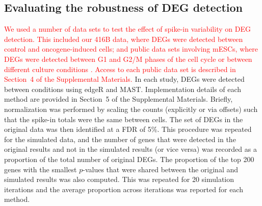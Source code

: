 \documentclass{article}
\newcommand{\suppsecdata}{4}
\newcommand{\suppsecsim}{5}
\newcommand{\revised}[1]{\textcolor{red}{#1}}
\begin{document}

\subsection*{Evaluating the robustness of DEG detection}
\revised{We used a number of data sets to test the effect of spike-in variability on DEG detection.
This included our 416B data, where DEGs were detected between control and oncogene-induced cells;
and public data sets involving mESCs, where DEGs were detected between G1 and G2/M phases of the cell cycle \autocite{buettner2015computational}
or between different culture conditions \autocite{grun2014validation,kolod2015single}.
Access to each public data set is described in Section~\suppsecdata{} of the Supplemental Materials.}
In each study, DEGs were detected between conditions using edgeR and MAST.
Implementation details of each method are provided in Section~\suppsecsim{} of the Supplemental Materials. 
Briefly, normalization was performed by scaling the counts (explicitly or via offsets) such that the spike-in totals were the same between cells.
The set of DEGs in the original data was then identified at a FDR of 5\%.
This procedure was repeated for the simulated data, and the number of genes that were detected in the original results and not in the simulated results (or vice versa) was recorded as a proportion of the total number of original DEGs.
The proportion of the top 200 genes with the smallest $p$-values that were shared between the original and simulated results was also computed.
This was repeated for 20 simulation iterations and the average proportion across iterations was reported for each method.
\end{document}
